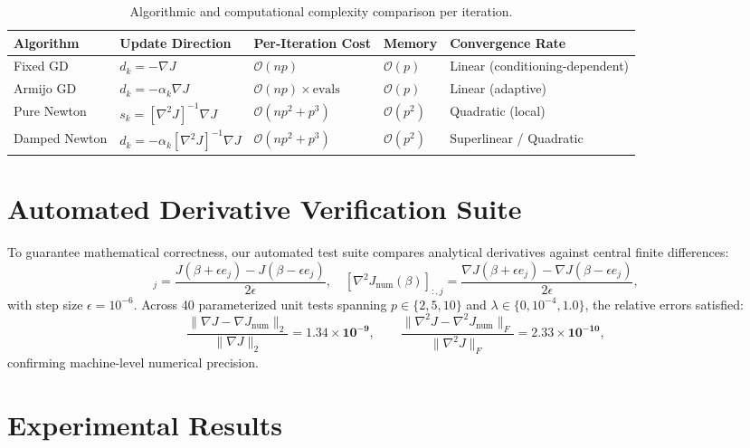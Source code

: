 \documentclass[11pt,a4paper]{article}
\theoremstyle{remark}\newtheorem{remark}{Remark}
\begin{document}
\begin{table}[ht]
\centering\small
\caption{Algorithmic and computational complexity comparison per iteration.}\label{tab:complexity}
\begin{tabular}{lllll}
\toprule
Algorithm & Update Direction & Per-Iteration Cost & Memory & Convergence Rate\\
\midrule
Fixed GD & $d_k = -\nabla J$ & $\mathcal{O}(np)$ & $\mathcal{O}(p)$ & Linear (conditioning-dependent)\\
Armijo GD & $d_k = -\alpha_k \nabla J$ & $\mathcal{O}(np) \times \text{evals}$ & $\mathcal{O}(p)$ & Linear (adaptive)\\
Pure Newton & $s_k = [\nabla^2 J]^{-1} \nabla J$ & $\mathcal{O}(np^2 + p^3)$ & $\mathcal{O}(p^2)$ & Quadratic (local)\\
Damped Newton & $d_k = -\alpha_k [\nabla^2 J]^{-1} \nabla J$ & $\mathcal{O}(np^2 + p^3)$ & $\mathcal{O}(p^2)$ & Superlinear / Quadratic\\
\bottomrule
\end{tabular}
\end{table}

\section{Automated Derivative Verification Suite}
To guarantee mathematical correctness, our automated test suite compares analytical derivatives against central finite differences:
\begin{equation}
  [\nabla J_{\text{num}}(\beta)]_j = \frac{J(\beta + \epsilon e_j) - J(\beta - \epsilon e_j)}{2\epsilon}, \quad
  [\nabla^2 J_{\text{num}}(\beta)]_{:, j} = \frac{\nabla J(\beta + \epsilon e_j) - \nabla J(\beta - \epsilon e_j)}{2\epsilon},
\end{equation}
with step size $\epsilon = 10^{-6}$. Across 40 parameterized unit tests spanning $p \in \{2, 5, 10\}$ and $\lambda \in \{0, 10^{-4}, 1.0\}$, the relative errors satisfied:
\begin{equation}
  \frac{\|\nabla J - \nabla J_{\text{num}}\|_2}{\|\nabla J\|_2} = \mathbf{1.34 \times 10^{-9}}, \qquad
  \frac{\|\nabla^2 J - \nabla^2 J_{\text{num}}\|_F}{\|\nabla^2 J\|_F} = \mathbf{2.33 \times 10^{-10}},
\end{equation}
confirming machine-level numerical precision.

\section{Experimental Results}
\end{document}
